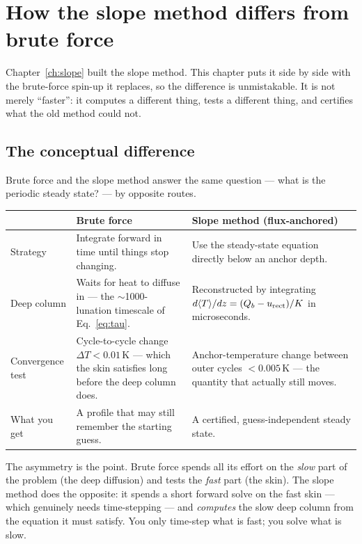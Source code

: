 \documentclass[11pt]{report}
\newcommand{\Tm}{\langle T\rangle}
\begin{document}
\chapter{How the slope method differs from brute force}\label{ch:bruteforce}

Chapter~\ref{ch:slope} built the slope method. This chapter puts it side by side
with the brute-force spin-up it replaces, so the difference is unmistakable. It
is not merely ``faster'': it computes a different thing, tests a different thing,
and certifies what the old method could not.

\section{The conceptual difference}

Brute force and the slope method answer the same question --- what is the
periodic steady state? --- by opposite routes.

\begin{center}\small
\begin{tabular}{@{}p{2.6cm}p{5.4cm}p{5.4cm}@{}}
\toprule
 & \textbf{Brute force} & \textbf{Slope method (flux-anchored)} \\
\midrule
Strategy & Integrate forward in time until things stop changing. & Use the steady-state equation directly below an anchor depth. \\
\addlinespace
Deep column & Waits for heat to diffuse in --- the $\sim$1000-lunation timescale of Eq.~\eqref{eq:tau}. & Reconstructed by integrating $d\Tm/dz=(Q_b-u_{\rm rect})/K$ in microseconds. \\
\addlinespace
Convergence test & Cycle-to-cycle change $\Delta T<0.01$\,K --- which the skin satisfies long before the deep column does. & Anchor-temperature change between outer cycles $<0.005$\,K --- the quantity that actually still moves. \\
\addlinespace
What you get & A profile that may still remember the starting guess. & A certified, guess-independent steady state. \\
\bottomrule
\end{tabular}
\end{center}

\noindent The asymmetry is the point. Brute force spends all its effort on the
\emph{slow} part of the problem (the deep diffusion) and tests the \emph{fast}
part (the skin). The slope method does the opposite: it spends a short forward
solve on the fast skin --- which genuinely needs time-stepping --- and
\emph{computes} the slow deep column from the equation it must satisfy. You only
time-step what is fast; you solve what is slow.
\end{document}
